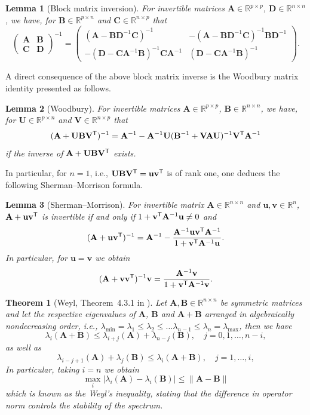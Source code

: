 \documentclass[MAL,biber]{nowfnt} %
\newtheorem{Theorem}{Theorem}
\newtheorem{Lemma}{Lemma}
\newcommand{\ie}{\emph{i.e.}}
\newcommand{\T}{{\sf T}}
\newcommand{\A}{{\mathbf{A}}}
\newcommand{\B}{{\mathbf{B}}}
\newcommand{\C}{{\mathbf{C}}}
\newcommand{\D}{{\mathbf{D}}}
\newcommand{\U}{{\mathbf{U}}}
\newcommand{\V}{{\mathbf{V}}}
\newcommand{\uu}{{\mathbf{u}}}
\renewcommand{\v}{{\mathbf{v}}}
\newcommand{\RR}{{\mathbb{R}}}
\begin{document}
\begin{Lemma}[Block matrix inversion]
For invertible matrices $\A \in \RR^{p \times p}$, $\D \in \RR^{n \times n}$, we have, for $\B \in \RR^{p \times n}$ and $\C \in \RR^{n \times p}$ that
\begin{equation*}
    \begin{pmatrix} \A & \B \\ \C & \D \end{pmatrix}^{-1} = \begin{pmatrix} (\A - \B \D^{-1} \C)^{-1} & - (\A - \B \D^{-1} \C)^{-1} \B \D^{-1} \\ -(\D - \C \A^{-1} \B)^{-1} \C \A^{-1} & (\D - \C \A^{-1} \B)^{-1} \end{pmatrix}.
\end{equation*}
\end{Lemma}
A direct consequence of the above block matrix inverse is the Woodbury matrix identity presented as follows.
\begin{Lemma}[Woodbury]
For invertible matrices $\A \in \RR^{p \times p}$, $\B \in \RR^{n \times n}$, we have, for $\U \in \RR^{p \times n}$ and $\V \in \RR^{n \times p}$ that
\begin{equation*}
    (\A + \U \B \V^\T)^{-1} = \A^{-1} - \A^{-1} \U (\B^{-1} + \V \A \U)^{-1} \V^\T \A^{-1}
\end{equation*}
if the inverse of $\A + \U \B \V^\T$ exists.
\end{Lemma}
In particular, for $n=1$, i.e., $\U \B \V^\T = \uu \v^\T$ is of rank one, one deduces the following Sherman–Morrison formula.
\begin{Lemma}[Sherman–Morrison]
For invertible matrix $\A \in \RR^{n \times n}$ and $\uu,\v \in \RR^n$, $\A + \uu \v^\T$ is invertible if and only if $1+\v^\T \A^{-1} \uu \neq 0$ and
\begin{equation*}
    (\A + \uu \v^\T)^{-1} = \A^{-1} - \frac{\A^{-1} \uu \v^\T \A^{-1} }{1+\v^\T \A^{-1} \uu}.
\end{equation*}
In particular, for $\uu = \v$ we obtain
\begin{equation*}
    (\A + \v \v^\T)^{-1} \v = \frac{\A^{-1} \v}{1+\v^\T \A^{-1} \v}.
\end{equation*}
\end{Lemma}


\begin{Theorem}[Weyl, Theorem~4.3.1 in \citep{horn2012matrix}]\label{theo:weyl}
Let $\A,\B \in \RR^{n \times n}$ be symmetric matrices and let the respective eigenvalues of $\A$, $\B$ and $\A+\B$ arranged in algebraically nondecreasing order, \ie, $\lambda_{\min} = \lambda_1 \le \lambda_2 \le \ldots \lambda_{n-1} \le \lambda_n = \lambda_{\max}$, then we have
\[
	\lambda_i(\A + \B) \le \lambda_{i+j} (\A) + \lambda_{n-j}(\B), \quad j=0,1,\ldots,n-i,
\]
as well as
\[
	\lambda_{i-j+1} (\A) + \lambda_j(\B) \le \lambda_i(\A + \B), \quad j=1,\ldots,i,
\]
In particular, taking $i=n$ we obtain
\[
	\max_i |\lambda_i(\A) - \lambda_i(\B)| \le \| \A - \B \|
\]
which is known as the Weyl's inequality, stating that the difference in operator norm controls the stability of the spectrum.
\end{Theorem}
\end{document}
